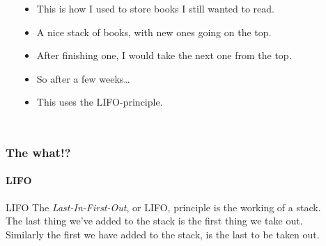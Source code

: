 \begin{frame}
\begin{columns}
\begin{center}
			\end{center}
		\begin{itemize}
			\item This is how I used to store books I still wanted to read.
				\pause
			\item A nice \alert{stack} of books, with new ones going on the top.
				\pause
			\item After finishing one, I would take the next one from the top.
				\pause
			\item So after a few weeks\dots
				\pause
			\item This uses the \alert{LIFO}-principle.
		\end{itemize}
	\end{columns}
\end{frame}

\begin{frame}
	\frametitle{The what!?}
	\framesubtitle{LIFO}
	
		\begin{block}{LIFO}
			The \textit{Last-In-First-Out}, or LIFO, principle is the working of a stack.\\
			\pause
			The last thing we've added to the stack is the first thing we take out.\\
			\pause
			Similarly the first we have added to the stack, is the last to be taken out.
		\end{block}	
\end{frame}

